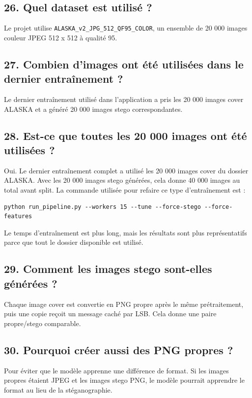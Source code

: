 \documentclass[11pt,a4paper]{article}
\begin{document}
\subsection{26. Quel dataset est utilisé ?}

Le projet utilise \texttt{ALASKA\_v2\_JPG\_512\_QF95\_COLOR}, un ensemble de 20 000 images couleur JPEG 512 x 512 à qualité 95.

\subsection{27. Combien d'images ont été utilisées dans le dernier entraînement ?}

Le dernier entraînement utilisé dans l'application a pris les 20 000 images cover ALASKA et a généré 20 000 images stego correspondantes.

\subsection{28. Est-ce que toutes les 20 000 images ont été utilisées ?}

Oui. Le dernier entraînement complet a utilisé les 20 000 images cover du dossier ALASKA. Avec les 20 000 images stego générées, cela donne 40 000 images au total avant split. La commande utilisée pour refaire ce type d'entraînement est :

\begin{lstlisting}
python run_pipeline.py --workers 15 --tune --force-stego --force-features
\end{lstlisting}

Le temps d'entraînement est plus long, mais les résultats sont plus représentatifs parce que tout le dossier disponible est utilisé.

\subsection{29. Comment les images stego sont-elles générées ?}

Chaque image cover est convertie en PNG propre après le même prétraitement, puis une copie reçoit un message caché par LSB. Cela donne une paire propre/stego comparable.

\subsection{30. Pourquoi créer aussi des PNG propres ?}

Pour éviter que le modèle apprenne une différence de format. Si les images propres étaient JPEG et les images stego PNG, le modèle pourrait apprendre le format au lieu de la stéganographie.
\end{document}
